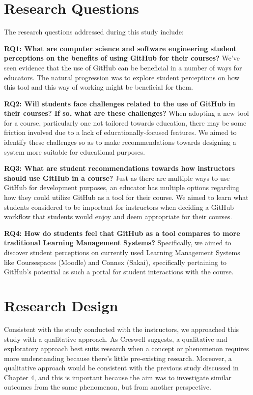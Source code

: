 \section{Research Questions}
The research questions addressed during this study include:

\bigskip
\textbf{RQ1: What are computer science and software engineering student perceptions on the benefits of using GitHub for their courses?} We've seen evidence that the use of GitHub can be beneficial in a number of ways for educators. The natural progression was to explore student perceptions on how this tool and this way of working might be beneficial for them.

\bigskip
\textbf{RQ2: Will students face challenges related to the use of GitHub in their courses? If so, what are these challenges?} When adopting a new tool for a course, particularly one not tailored towards education, there may be some friction involved due to a lack of educationally-focused features. We aimed to identify these challenges so as to make recommendations towards designing a system more suitable for educational purposes.

\bigskip
\textbf{RQ3: What are student recommendations towards how instructors should use GitHub in a course?} Just as there are multiple ways to use GitHub for development purposes, an educator has multiple options regarding how they could utilize GitHub as a tool for their course. We aimed to learn what students considered to be important for instructors when deciding a GitHub workflow that students would enjoy and deem appropriate for their courses.

\bigskip
\textbf{RQ4: How do students feel that GitHub as a tool compares to more traditional Learning Management Systems?} Specifically, we aimed to discover student perceptions on currently used Learning Management Systems like Coursespaces (Moodle) and Connex (Sakai), specifically pertaining to GitHub's potential as such a portal for student interactions with the course.

\section{Research Design}
Consistent with the study conducted with the instructors, we approached this study with a qualitative approach. As Creswell \cite{creswell2013research} suggests, a qualitative and exploratory approach best suits research when a concept or phenomenon requires more understanding because there's little pre-existing research. Moreover, a qualitative approach would be consistent with the previous study discussed in Chapter 4, and this is important because the aim was to investigate similar outcomes from the same phenomenon, but from another perspective. %

